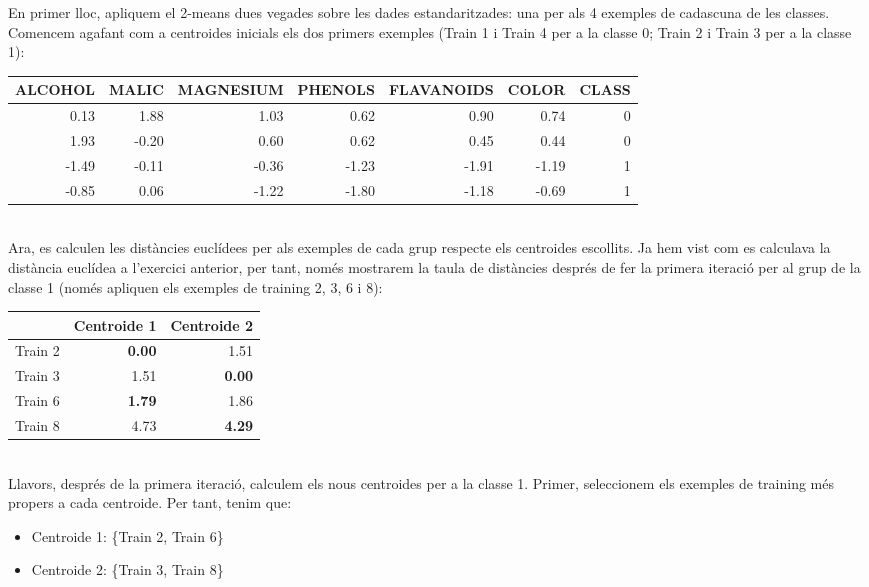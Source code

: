 \documentclass{article} %
\begin{document}
{\color{blue}
	En primer lloc, apliquem  el 2-means dues vegades sobre les dades estandaritzades: una per als 4 exemples de cadascuna de les classes. \\

	Comencem agafant com a centroides inicials els dos primers exemples (Train 1 i Train 4 per a la classe 0; Train 2 i Train 3 per a la classe 1): \\

	{\selectfont\small
	\begin{tabular}{r r r r r r r}
	 	ALCOHOL & MALIC & MAGNESIUM & PHENOLS & FLAVANOIDS & COLOR & CLASS \\ \hline
		0.13 & 1.88 & 1.03 & 0.62 & 0.90 & 0.74 & 0 \\
		1.93 & -0.20 & 0.60 & 0.62 & 0.45 & 0.44 & 0 \\
		-1.49 & -0.11 & -0.36 & -1.23 & -1.91 & -1.19 & 1 \\
		-0.85 & 0.06 & -1.22 & -1.80 & -1.18 & -0.69 & 1 \\
	\end{tabular}
	} \\

	Ara, es calculen les distàncies euclídees per als exemples de cada grup respecte els centroides escollits. Ja hem vist com es calculava la distància euclídea a l'exercici anterior, per tant, només mostrarem la taula de distàncies després de fer la primera iteració per al grup de la classe 1 (només apliquen els exemples de training 2, 3, 6 i 8): \\

	{\selectfont\small
	\begin{tabular}{r | r r}
		& Centroide 1 & Centroide 2 \\ \hline
		Train 2 & \textbf{0.00} & 1.51 \\
		Train 3 & 1.51 & \textbf{0.00} \\
		Train 6 & \textbf{1.79} & 1.86 \\
		Train 8 & 4.73 & \textbf{4.29} \\
	\end{tabular}
	} \\

	Llavors, després de la primera iteració, calculem els nous centroides per a la classe 1. Primer, seleccionem els exemples de training més propers a cada centroide. Per tant, tenim que:\\

	\begin{itemize}
		\item[] Centroide 1: \{Train 2, Train 6\}
		\item[] Centroide 2: \{Train 3, Train 8\}
	\end{itemize}

}
\end{document}
